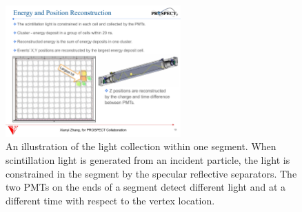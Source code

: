 \begin{figure}[h]
    \centering
    \includegraphics[width=0.6\textwidth]{Figures/Z_reconstruction.pdf}
    \caption[An illustration of a single segment light collection ]{
	An illustration of the light collection within one segment.
	When scintillation light is generated from an incident particle, the light is constrained in the segment by the specular reflective separators.
	The two PMTs on the ends of a segment detect different light and at a different time with respect to the vertex location.
	}
    \label{fig:Zreconstruction}
\end{figure}
	

